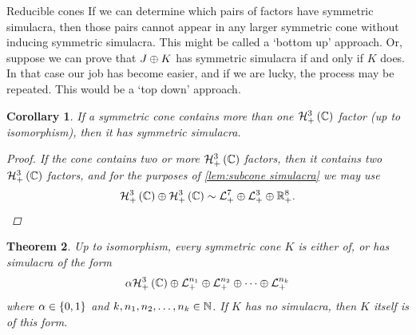 \documentclass{interact}
\theoremstyle{plain}
\newtheorem{theorem}{Theorem}[section]
\newtheorem{corollary}[theorem]{Corollary}
\theoremstyle{definition}
\theoremstyle{remark}
\begin{document}
\begin{section}{Reducible cones}
    If we can determine which pairs of factors have symmetric
    simulacra, then those pairs cannot appear in any larger symmetric
    cone without inducing symmetric simulacra. This might be called a
    `bottom up' approach. Or, suppose we can prove that
    ${J}\oplus{K}$ has symmetric simulacra if and only if $K$
    does. In that case our job has become easier, and if we are lucky,
    the process may be repeated. This would be a `top down'
    approach.

    \begin{corollary}\label{cor:no multiple complex factors}
      If a symmetric cone contains more than one
      $\Hnplus[3]\of{\Cn[1]}$ factor (up to isomorphism), then it has
      symmetric simulacra.
      \begin{proof}
        If the cone contains two or more $\Hnplus[3]\of{\Cn[1]}$
        factors, then it contains two $\Hnplus[3]\of{\Cn[1]}$ factors,
        and for the purposes of \cref{lem:subcone simulacra} we may use
        \begin{equation*}
          \directsum{\Hnplus[3]\of{\Cn[1]}}{\Hnplus[3]\of{\Cn[1]}}
          \sim
          \Lnplus[7] \oplus \Lnplus[3] \oplus \Rnplus[8].
          \qedhere
        \end{equation*}
      \end{proof}
    \end{corollary}

    \begin{theorem}\label{thm:two sufficient families}
      Up to isomorphism, every symmetric cone $K$ is either of, or has
      simulacra of the form
      \begin{equation*}
        \alpha \Hnplus[3]\of{\Cn[1]}
        \oplus
        \Lnplus[n_{1}]
        \oplus
        \Lnplus[n_{2}]
        \oplus
        \cdots
        \oplus
        \Lnplus[n_{k}]
      \end{equation*}
      where $\alpha \in \left\lbrace{0,1}\right\rbrace$ and $k,n_{1},n_{2},\ldots,n_{k} \in
      \Nn[1]$. If $K$ has no simulacra, then $K$ itself is of this
      form.


\end{theorem}
\end{section}
\end{document}
